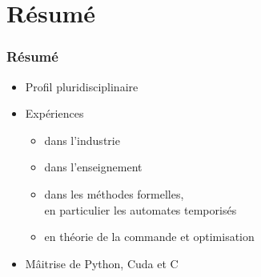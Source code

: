 \documentclass[usenames,dvipsnames,xcolor=table]{beamer}
\newcommand{\CC}{C\nolinebreak\hspace{-.05em}\raisebox{.4ex}{\tiny\bf+}\nolinebreak\hspace{-.10em}\raisebox{.4ex}{\tiny\bf +}}\def\CC{{C\nolinebreak[4]\hspace{-.05em}\raisebox{.4ex}{\tiny\bf ++}}}
\begin{document}

\section{R\'esum\'e}

\begin{frame}
    \frametitle{R\'esum\'e}
    
    \begin{itemize}
        \item Profil pluridisciplinaire
	    
	    \item Exp\'eriences
	    \begin{itemize}
	        \item[\ding{212}] dans l'industrie
	        \item[\ding{212}] dans l'enseignement
	        \item[\ding{212}] dans les m\'ethodes formelles,\\en particulier les automates temporis\'es
	        \item[\ding{212}] en th\'eorie de la commande et optimisation
	    \end{itemize}
	    \item M\^aitrise de Python, Cuda et \CC
    \end{itemize}
	\begin{center}
	\end{center}
    
\end{frame}

\end{document}
